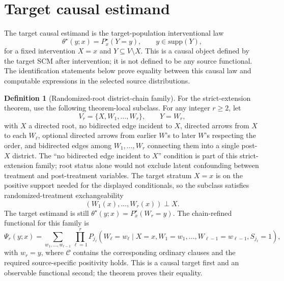 \documentclass[11pt]{article}
\theoremstyle{definition}
\newtheorem{definition}{Definition}
\theoremstyle{plain}
\theoremstyle{remark}
\begin{document}
\section{Target causal estimand}
The target causal estimand is the target-population interventional law
\[
  \theta^\star(y;x)=P^\star_x(Y=y),
  \qquad y\in\mathrm{supp}(Y),
\]
for a fixed intervention \(X=x\) and \(Y\subseteq V\setminus X\).  This is a
causal object defined by the target SCM after intervention; it is not defined
to be any source functional.  The identification statements below prove
equality between this causal law and computable expressions in the selected
source distributions.

\begin{definition}[Randomized-root district-chain family]\label{def:chain-family}
For the strict-extension theorem, use the following theorem-local subclass.
For any integer \(r\ge 2\), let
\[
  V_r=\{X,W_1,\ldots,W_r\},\qquad Y=W_r,
\]
with \(X\) a directed root, no bidirected edge incident to \(X\), directed
arrows from \(X\) to each \(W_\ell\), optional directed arrows from earlier
\(W\)'s to later \(W\)'s respecting the order, and bidirected edges among
\(W_1,\ldots,W_r\) connecting them into a single post-\(X\) district.  The
``no bidirected edge incident to \(X\)'' condition is part of this
strict-extension family; root status alone would not exclude latent
confounding between treatment and post-treatment variables.  The target
stratum \(X=x\) is on the positive support needed for the displayed
conditionals, so the subclass satisfies randomized-treatment exchangeability
\[
  (W_1(x),\ldots,W_r(x))\perp X.
\]
The target estimand is still
\(\theta^\star(y;x)=P^\star_x(W_r=y)\).  The chain-refined functional for
this family is
\[
  \Psi_r(y;x)
  =
  \sum_{w_1,\ldots,w_{r-1}}
  \prod_{\ell=1}^{r}
  P_{j_\ell}\!\left(
    W_\ell=w_\ell
    \mid X=x,W_1=w_1,\ldots,W_{\ell-1}=w_{\ell-1},S_{j_\ell}=1
  \right),
\]
with \(w_r=y\), where \(\mathcal C\) contains the corresponding ordinary
clauses and the required source-specific positivity holds.  This is a causal
target first and an observable functional second; the theorem proves their
equality.
\end{definition}
\end{document}
